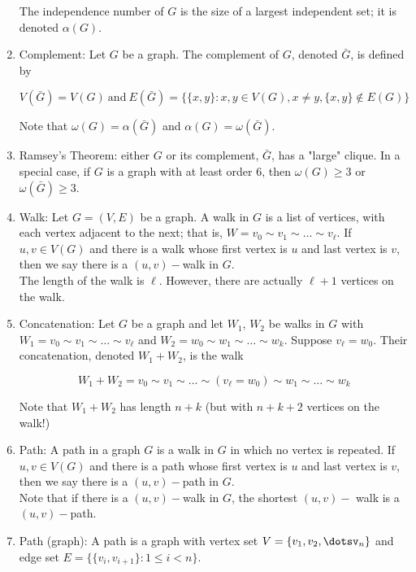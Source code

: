 \documentclass{article}
\begin{document}
\begin{enumerate}
		The independence number of $G$ is the size of a largest independent set;
		it is denoted $\alpha (G)$.
		
		\item Complement: Let $G$ be a graph.
		The complement of $G$, denoted $\bar G$, is defined by
		
		\[V(\bar G)=V(G)\: \text{and}\: E(\bar G)=\{\{x,y\}: x,y \in V(G), x\neq y, \{x,y\}\not\in E(G)\}\]
		
		Note that $\omega(G)=\alpha(\bar G)$ and $\alpha(G)=\omega(\bar G)$.
		
		\item Ramsey's Theorem: either $G$ or its complement, $\bar G$, has a "large" clique.
		In a special case, if $G$ is a graph with at least order $6$, then $\omega(G)\geq 3$ or $\omega(\bar G)\geq 3$.
		
		\item Walk: Let $G=(V,E)$ be a graph.
		A walk in $G$ is a list of vertices, with each vertex adjacent to the next;
		that is, $W=v_0\sim v_1\sim\dots\sim v_\ell$.
		If $u,v\in V(G)$ and there is a walk whose first vertex is $u$ and last vertex is $v$, then we say there is a $(u,v)-$walk in $G$.\\
		
		The length of the walk is $\ell$.
		However, there are actually $\ell +1$ vertices on the walk.
		
		\item Concatenation: Let $G$ be a graph and let $W_1$, $W_2$ be walks in $G$ with $W_1=v_0\sim v_1\sim \dots\sim v_\ell$ and $W_2=w_0\sim w_1\sim \dots\sim w_k$.
		Suppose $v_\ell=w_0$.
		Their concatenation, denoted $W_1+W_2$, is the walk
		
		\[W_1+W_2=v_0\sim v_1\sim\dots\sim(v_\ell=w_0)\sim w_1\sim\dots\sim w_k\]
		
		Note that $W_1+W_2$ has length $n+k$ (but with $n+k+2$ vertices on the walk!)
		
		\item Path: A path in a graph $G$ is a walk in $G$ in which no vertex is repeated.
		If $u,v\in V(G)$ and there is a path whose first vertex is $u$ and last vertex is $v$, then we say there is a $(u,v)-$path in $G$. \\
		
		Note that if there is a $(u,v)-$walk in $G$, the shortest $(u,v)-$ walk is a $(u,v)-$path.
		
		\item Path (graph): A path is a graph with vertex set $V=\{v_1,v_2,\dotsv_n\}$ and edge set $E=\{\{v_i,v_{i+1}\}:1\leq i<n\}$.\\
		

\end{enumerate}
\end{document}
